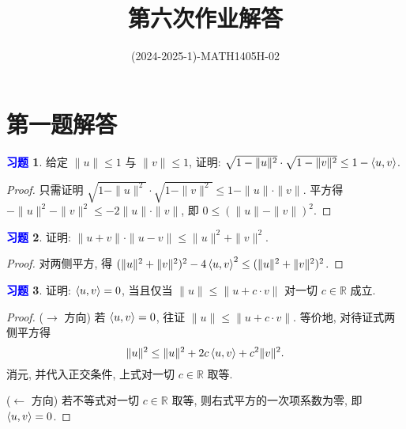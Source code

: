 \documentclass[11pt]{ctexart}
\title{第六次作业解答}
\author{(2024-2025-1)-MATH1405H-02}
\theoremstyle{definition}
\numberwithin{equation}{section}
\theoremstyle{definition}
\newtheorem{exercise}{\textcolor{blue}{习题}}
\theoremstyle{remark}
\begin{document}
\maketitle

\vspace{5cm}

\newpage

\section{第一题解答}

\begin{exercise}
    给定 $\|u\|\leq 1$ 与 $\|v\|\leq 1$, 证明: $\sqrt{1-\|u\|^2}\cdot \sqrt{1-\|v\|^2}\leq 1-\braket{u,v}$.
    \begin{proof}
        只需证明 $\sqrt{1-\|u\|^2}\cdot \sqrt{1-\|v\|^2}\leq 1-\|u\|\cdot \|v\|$. 平方得 $-\|u\|^2-\|v\|^2\leq -2\|u\|\cdot \|v\|$, 即 $0\leq (\|u\|-\|v\|)^2$. 
    \end{proof}
\end{exercise}  

\begin{exercise}
    证明: $\|u+v\|\cdot \|u-v\|\leq \|u\|^2+\|v\|^2$.
    \begin{proof}
        对两侧平方, 得 $(\|u\|^2+\|v\|^2)^2-4\braket{u,v}^2\leq(\|u\|^2+\|v\|^2)^2$. 
    \end{proof}
\end{exercise}

\begin{exercise}
    证明: $\braket{u,v}=0$, 当且仅当 $\|u\|\leq \|u+c \cdot v\|$ 对一切 $c\in \mathbb R$ 成立.
    \begin{proof}
        ($\to$ 方向) 若 $\braket{u,v}=0$, 往证 $\|u\|\leq \|u+c \cdot v\|$. 等价地, 对待证式两侧平方得
        \begin{equation}
            \|u\|^2\leq \|u\|^2+2c\braket{u,v}+c^2\|v\|^2.
        \end{equation} 
        消元, 并代入正交条件, 上式对一切 $c\in \mathbb R$ 取等. 

        ($\gets$ 方向) 若不等式对一切 $c\in \mathbb R$ 取等, 则右式平方的一次项系数为零, 即 $\braket{u,v}=0$. 
    \end{proof}
\end{exercise}
\end{document}
